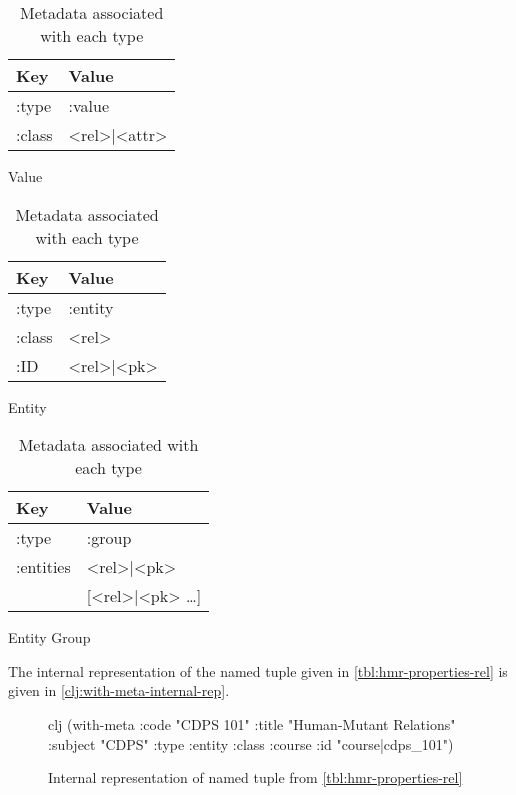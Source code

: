 			\begin{table}[H]
				\begin{subtable}[b]{0.33\linewidth}
					\centering
					
					\begin{tabular}{ll}
						\toprule
						Key & Value \\
						\midrule
						:type & :value \\
						:class & <rel>|<attr> \\
						\bottomrule
					\end{tabular}
					
					\caption{Value}
				\end{subtable}
				\begin{subtable}[b]{0.33\linewidth}
					\centering
					
					\begin{tabular}{ll}
						\toprule
						Key & Value \\
						\midrule
						:type & :entity \\
						:class & <rel> \\
						:ID & <rel>|<pk> \\
						\bottomrule
					\end{tabular}
					
					\caption{Entity}
				\end{subtable}
				\begin{subtable}[b]{0.33\linewidth}
					\centering
					
					\begin{tabular}{ll}
						\toprule
						Key & Value \\
						\midrule
						:type & :group \\
						:entities & <rel>|<pk> \\
						 & [<rel>|<pk> \ldots] \\
						\bottomrule
					\end{tabular}
					
					\caption{Entity Group}
				\end{subtable}
				
				\caption{Metadata associated with each type}
				\label{tbl:type-metadata}
			\end{table}
			
			The internal representation of the named tuple given in \vref{tbl:hmr-properties-rel} is given in \vref{clj:with-meta-internal-rep}.
			
			\begin{figure}[H]
				\begin{singlespaced}
					\begin{pygments}{clj}
(with-meta
  {:code    "CDPS 101"
   :title   "Human-Mutant Relations"
   :subject "CDPS"}
  {:type  :entity
   :class :course
   :id    "course|cdps_101"})
					\end{pygments}
				\end{singlespaced}
				
				\caption{Internal representation of named tuple from \vref{tbl:hmr-properties-rel}}
				\label{clj:with-meta-internal-rep}
			\end{figure}
			
